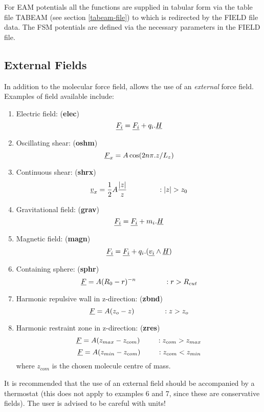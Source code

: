 For EAM potentials all the functions are supplied in tabular form via
the table file TABEAM (see section \ref{tabeam-file}) to which \D{} is
redirected by the FIELD file data.  The FSM potentials are defined via
the necessary parameters in the FIELD file.


\subsection{External Fields}

In addition to the molecular force field, \D{} allows the use of
an {\em external} force field. Examples of field available include:
\begin{enumerate}
\item Electric field: ({\bf elec})
\begin{equation} \mbox{$\underline{F_i}$} = \mbox{$\underline{F_i}$} + q_i. \mbox{$\underline{H}$} \end {equation}
\item Oscillating shear: ({\bf oshm})
\begin{equation} \mbox{$\underline{F}$}_{x}=A\cos(2n\pi.z/L_{z}) \end{equation}
\item Continuous shear: ({\bf shrx})
\begin{equation}
\vek{v}_{x}=\frac{1}{2}A\frac{|z|}{z}~~~~~~~~~~~~~:|z|>z_{0}\end{equation}
\item Gravitational field: ({\bf grav})
\begin{equation} \mbox{$\underline{F_i}$} = \mbox{$\underline{F_i}$} + m_i. \mbox{$\underline{H}$} \end {equation}
\item Magnetic field: ({\bf magn})
\begin{equation} \mbox{$\underline{F_i}$} = \mbox{$\underline{F_i}$} + q_i.(\mbox{$\underline{v_i}$}\wedge \mbox{$\underline{H}$})
\end {equation}
\item Containing sphere: ({\bf sphr})
\begin{equation} \mbox{$\underline{F}$}=A(R_{0}-r)^{-n}~~~~~~~~~~~~: r>R_{cut} \end{equation}
\item Harmonic repulsive wall in z-direction: ({\bf zbnd})
\begin{equation} \mbox{$\underline{F}$}=A(z_{o}-z)~~~~~~~~~~~~: z>z_{o} \end{equation}
\item Harmonic restraint zone in z-direction: ({\bf zres})
\begin{equation} \mbox{$\underline{F}$}=A(z_{max}-z_{com})~~~~~~~: z_{com}>z_{max} \end{equation}
\begin{equation} \mbox{$\underline{F}$}=A(z_{min}-z_{com})~~~~~~~: z_{com}<z_{min}
\end{equation}
where $z_{com}$ is the chosen molecule centre of mass.
\end{enumerate}
It is recommended that the use of an external field should be
accompanied by a thermostat (this does not apply to
examples 6 and 7, since these are conservative fields). The user is
advised to be careful with units!

